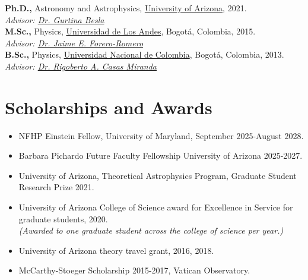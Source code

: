 \documentclass[14pt]{article}
\begin{document}
\textbf{Ph.D.,} Astronomy and Astrophysics, \href{https://www.as.arizona.edu/}{University of Arizona}, 2021.\\
\indent \textit{Advisor: \href{https://sites.google.com/view/thebeslagroup/home}{Dr. Gurtina Besla}}\\

\textbf{M.Sc.,}  Physics, \href{https://fisica.uniandes.edu.co/en}{Universidad de Los Andes}, Bogot\'a, Colombia, 2015.\\
\indent \textit{Advisor: \href{http://wwwprof.uniandes.edu.co/~je.forero/}{Dr. Jaime E. Forero-Romero}}\\

\textbf{B.Sc.,} Physics,
\href{https://unal.edu.co/en.html}{Universidad Nacional de Colombia}, Bogot\'a, Colombia, 2013.\\
\indent \textit{Advisor:
\href{https://www.iau.org/administration/membership/individual/16146/}{Dr.
Rigoberto A. Casas Miranda}}



\section*{Scholarships and Awards}


\begin{itemize}
  \setlength\itemsep{0.0em}
  \renewcommand\labelitemi{$\cdot$}

\item NFHP Einstein Fellow, University of Maryland, September 2025-August 2028. 
\item Barbara Pichardo Future Faculty Fellowship University of Arizona 2025-2027. 
\item University of Arizona, Theoretical Astrophysics Program, Graduate Student
Research Prize 2021.
\item University of Arizona College of Science award for Excellence in
Service for graduate students, 2020.\\ 
\indent \textit{(Awarded to one graduate student across the college of
science per year.)}
\item University of Arizona theory travel grant, 2016, 2018. 
\item McCarthy-Stoeger Scholarship 2015-2017, Vatican Observatory.
\end{itemize}
\end{document}
